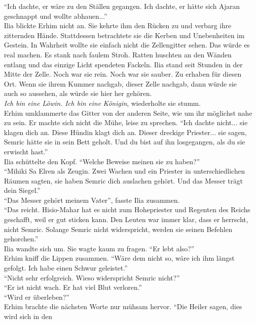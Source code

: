 ``Ich dachte, er wäre zu den Ställen gegangen. Ich dachte, er hätte sich Ajaran geschnappt und 
wollte abhauen...''\\
Ilia blickte Erhim nicht an. Sie kehrte ihm den Rücken zu und verbarg ihre zitternden Hände. 
Stattdessen betrachtete sie die Kerben und Unebenheiten im Gestein. In Wahrheit wollte sie einfach 
nicht die Zellengitter sehen. Das würde es real machen. Es stank nach faulem Stroh. Ratten huschten 
an den Wänden entlang und das einzige Licht spendeten Fackeln. Ilia stand seit Stunden in der Mitte 
der Zelle. Noch war sie rein. Noch war sie sauber. Zu erhaben für diesen Ort. Wenn sie ihrem Kummer 
nachgab, dieser Zelle nachgab, dann würde sie auch so aussehen, als würde sie hier her gehören.\\
\textit{Ich bin eine Löwin. Ich bin eine Königin}, wiederholte sie stumm.\\
Erhim umklammerte das Gitter von der anderen Seite, wie um ihr möglichst nahe zu sein. Er machte 
sich nicht die Mühe, leise zu sprechen. ``Ich dachte nicht... sie klagen dich an. Diese Hündin 
klagt dich an. Dieser dreckige Priester... sie sagen, Semric hätte sie in sein Bett geholt. Und du 
bist auf ihn losgegangen, als du sie erwischt hast.''\\
Ilia schüttelte den Kopf. ``Welche Beweise meinen sie zu haben?''\\
``Mihiki Sa Elren als Zeugin. Zwei Wachen und ein Priester in unterschiedlichen Räumen sagten, sie 
haben Semric dich auslachen gehört. Und das Messer trägt dein Siegel.''\\
``Das Messer gehört meinem Vater'', fasste Ilia zusammen.\\
``Das reicht. Hisio-Mahar hat es nicht zum Hohepriester und Regenten des Reichs geschafft, weil er 
gut sticken kann. Den Leuten war immer klar, dass er herrscht, nicht Semric. Solange Semric nicht 
widerspricht, werden sie seinen Befehlen gehorchen.''\\
Ilia wandte sich um. Sie wagte kaum zu fragen. ``Er lebt also?''\\
Erhim kniff die Lippen zusammen. ``Wäre dem nicht so, wäre ich ihm längst gefolgt. Ich habe einen 
Schwur geleistet.''\\
``Nicht sehr erfolgreich. Wieso widerspricht Semric nicht?''\\
``Er ist nicht wach. Er hat viel Blut verloren.''\\
``Wird er überleben?''\\
Erhim brachte die nächsten Worte nur mühsam hervor. ``Die Heiler sagen, dies wird sich in den 

